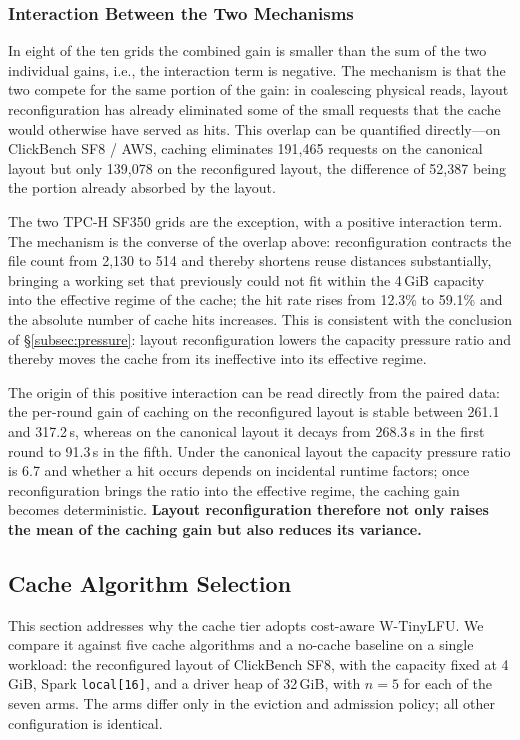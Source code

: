 \subsubsection{Interaction Between the Two Mechanisms}

In eight of the ten grids the combined gain is smaller than the sum of the two
individual gains, i.e., the interaction term is negative. The mechanism is that
the two compete for the same portion of the gain: in coalescing physical reads,
layout reconfiguration has already eliminated some of the small requests that
the cache would otherwise have served as hits. This overlap can be quantified
directly---on ClickBench SF8 / AWS, caching eliminates 191{,}465 requests on the
canonical layout but only 139{,}078 on the reconfigured layout, the difference of
52{,}387 being the portion already absorbed by the layout.

The two TPC-H SF350 grids are the exception, with a positive interaction term.
The mechanism is the converse of the overlap above: reconfiguration contracts
the file count from 2{,}130 to 514 and thereby shortens reuse distances
substantially, bringing a working set that previously could not fit within the
4\,GiB capacity into the effective regime of the cache; the hit rate rises from
12.3\% to 59.1\% and the absolute number of cache hits increases. This is
consistent with the conclusion of \S\ref{subsec:pressure}: layout
reconfiguration lowers the capacity pressure ratio and thereby moves the cache
from its ineffective into its effective regime.

The origin of this positive interaction can be read directly from the paired
data: the per-round gain of caching on the reconfigured layout is stable between
261.1 and 317.2\,s, whereas on the canonical layout it decays from 268.3\,s in
the first round to 91.3\,s in the fifth. Under the canonical layout the capacity
pressure ratio is 6.7 and whether a hit occurs depends on incidental runtime
factors; once reconfiguration brings the ratio into the effective regime, the
caching gain becomes deterministic. \textbf{Layout reconfiguration therefore not
only raises the mean of the caching gain but also reduces its variance.}

\subsection{Cache Algorithm Selection}
\label{subsec:policy}

This section addresses why the cache tier adopts cost-aware W-TinyLFU. We
compare it against five cache algorithms and a no-cache baseline on a single
workload: the reconfigured layout of ClickBench SF8, with the capacity fixed at
4\,GiB, Spark \texttt{local[16]}, and a driver heap of 32\,GiB, with $n=5$ for
each of the seven arms. The arms differ only in the eviction and admission
policy; all other configuration is identical.

